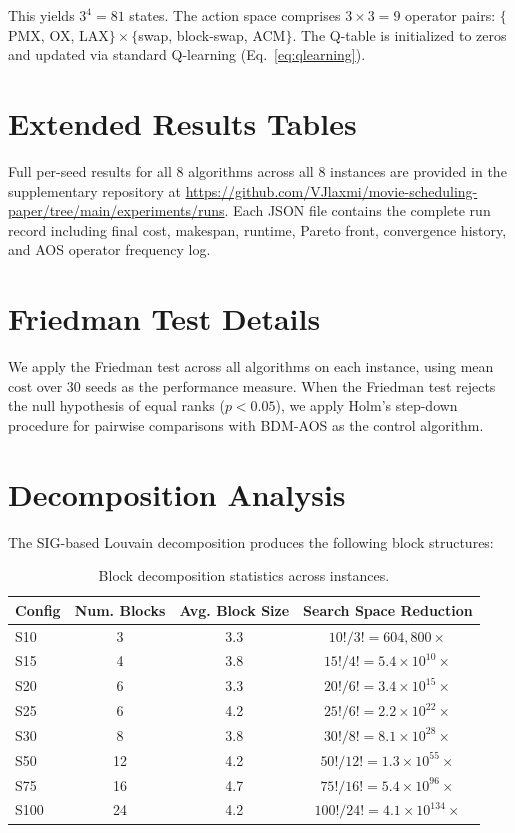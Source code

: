 This yields $3^4 = 81$ states.
The action space comprises $3 \times 3 = 9$ operator pairs: $\{$PMX, OX, LAX$\} \times \{$swap, block-swap, ACM$\}$.
The Q-table is initialized to zeros and updated via standard Q-learning (Eq.~\ref{eq:qlearning}).

\section{Extended Results Tables}
\label{app:extended_results}

Full per-seed results for all 8 algorithms across all 8 instances are provided in the supplementary repository at \url{https://github.com/VJlaxmi/movie-scheduling-paper/tree/main/experiments/runs}.
Each JSON file contains the complete run record including final cost, makespan, runtime, Pareto front, convergence history, and AOS operator frequency log.

\section{Friedman Test Details}
\label{app:friedman}

We apply the Friedman test across all algorithms on each instance, using mean cost over 30 seeds as the performance measure.
When the Friedman test rejects the null hypothesis of equal ranks ($p < 0.05$), we apply Holm's step-down procedure for pairwise comparisons with BDM-AOS as the control algorithm.

\section{Decomposition Analysis}
\label{app:decomposition}

The SIG-based Louvain decomposition produces the following block structures:

\begin{table}[h]
\centering
\caption{Block decomposition statistics across instances.}
\label{tab:decomposition}
\small
\begin{tabular}{lccc}
\toprule
\textbf{Config} & \textbf{Num. Blocks} & \textbf{Avg. Block Size} & \textbf{Search Space Reduction} \\
\midrule
S10  & 3   & 3.3 & $10!/3! = 604{,}800\times$   \\
S15  & 4   & 3.8 & $15!/4! = 5.4 \times 10^{10}\times$  \\
S20  & 6   & 3.3 & $20!/6! = 3.4 \times 10^{15}\times$  \\
S25  & 6   & 4.2 & $25!/6! = 2.2 \times 10^{22}\times$  \\
S30  & 8   & 3.8 & $30!/8! = 8.1 \times 10^{28}\times$  \\
S50  & 12  & 4.2 & $50!/12! = 1.3 \times 10^{55}\times$ \\
S75  & 16  & 4.7 & $75!/16! = 5.4 \times 10^{96}\times$ \\
S100 & 24  & 4.2 & $100!/24! = 4.1 \times 10^{134}\times$ \\
\bottomrule
\end{tabular}
\end{table}

